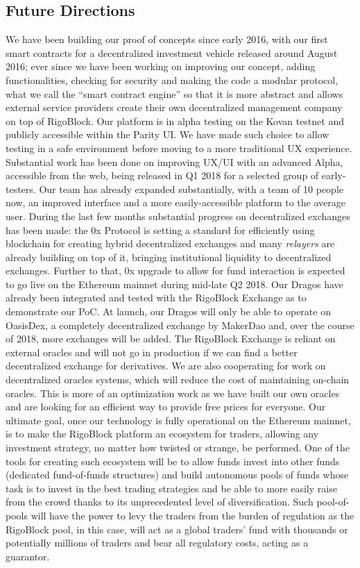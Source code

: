 \documentclass[9pt,oneside]{amsart}
\begin{document}
\begin{multicols}{2}
\section{Future Directions} \label{ch:future}
We have been building our proof of concepts since early 2016, with our first smart contracts for a decentralized investment vehicle released around August 2016; ever since we have been working on improving our concept, adding functionalities, checking for security and making the code a modular protocol, what we call the “smart contract engine” so that it is more abstract and allows external service providers create their own decentralized management company on top of RigoBlock. Our platform is in alpha testing on the Kovan testnet and publicly accessible within the Parity UI. We have made such choice to allow testing in a safe environment before moving to a more traditional UX experience.
Substantial work has been done on improving UX/UI with an advanced Alpha, accessible from the web, being released in Q1 2018 for a selected group of early-testers. Our team has already expanded substantially, with a team of 10 people now, an improved interface and a more easily-accessible platform to the average user.
During the last few months substantial progress on decentralized exchanges has been made: the 0x Protocol is setting a standard for efficiently using blockchain for creating hybrid decentralized exchanges and many \textit{relayers} are already building on top of it, bringing institutional liquidity to decentralized exchanges. Further to that, 0x upgrade to allow for fund interaction is expected to go live on the Ethereum mainnet during mid-late Q2 2018.
Our Dragos have already been integrated and tested with the RigoBlock Exchange as to demonstrate our PoC. At launch, our Dragos will only be able to operate on OasisDex, a completely decentralized exchange by MakerDao and, over the course of 2018, more exchanges will be added.
The RigoBlock Exchange is reliant on external oracles and will not go in production if we can find a better decentralized exchange for derivatives. We are also cooperating for work on decentralized oracles systems, which will reduce the cost of maintaining on-chain oracles. This is more of an optimization work as we have built our own oracles and are looking for an efficient way to provide free prices for everyone.
Our ultimate goal, once our technology is fully operational on the Ethereum mainnet, is to make the RigoBlock platform an ecosystem for traders, allowing any investment strategy, no matter how twisted or strange, be performed. One of the tools for creating such ecosystem will be to allow funds invest into other funds (dedicated fund-of-funds structures) and build autonomous pools of funds whose task is to invest in the best trading strategies and be able to more easily raise from the crowd thanks to its unprecedented level of diversification. Such pool-of-pools will have the power to levy the traders from the burden of regulation as the RigoBlock pool, in this case, will act as a global traders’ fund with thousands or potentially millions of traders and bear all regulatory costs, acting as a guarantor.


\end{multicols}
\end{document}
